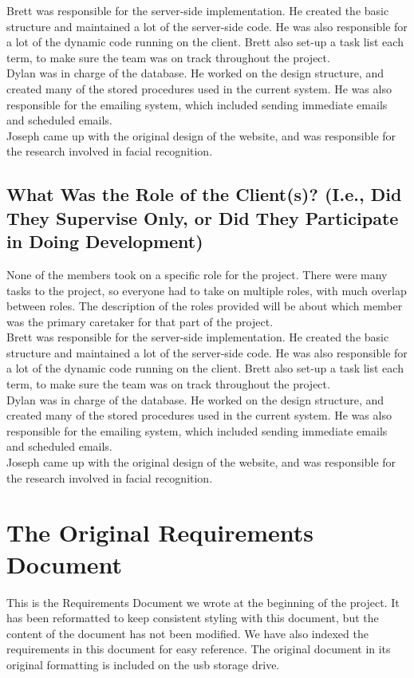 \documentclass[10pt, onecolumn, twoside, peerreview]{IEEEtran}
\begin{document}
Brett was responsible for the server-side implementation. He created the basic structure and maintained a lot of the server-side code. He was also responsible for a lot of the dynamic code running on the client. Brett also set-up a task list each term, to make sure the team was on track throughout the project.\\

Dylan was in charge of the database. He worked on the design structure, and created many of the stored procedures used in the current system. He was also responsible for the emailing system, which included sending immediate emails and scheduled emails.\\

Joseph came up with the original design of the website, and was responsible for the research involved in facial recognition.

\subsection{What Was the Role of the Client(s)? (I.e., Did They Supervise Only, or Did They Participate in Doing Development)}
None of the members took on a specific role for the project. There were many tasks to the project, so everyone had to take on multiple roles, with much overlap between roles. The description of the roles provided will be about which member was the primary caretaker for that part of the project.\\

Brett was responsible for the server-side implementation. He created the basic structure and maintained a lot of the server-side code. He was also responsible for a lot of the dynamic code running on the client. Brett also set-up a task list each term, to make sure the team was on track throughout the project.\\

Dylan was in charge of the database. He worked on the design structure, and created many of the stored procedures used in the current system. He was also responsible for the emailing system, which included sending immediate emails and scheduled emails.\\

Joseph came up with the original design of the website, and was responsible for the research involved in facial recognition.


\section{The Original Requirements Document}
This is the Requirements Document we wrote at the beginning of the
project. It has been reformatted to keep consistent styling with this document, but the content of the document has
not been modified. We have also indexed the requirements in this document for easy reference. The original document in its original formatting is included on the usb storage drive.
\end{document}
